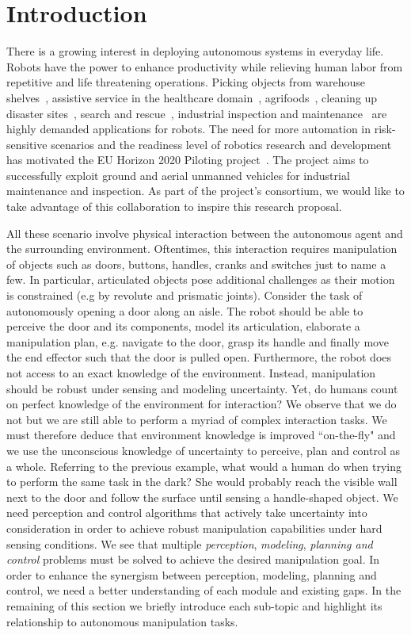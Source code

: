 \section{Introduction}
\label{sec:Introduction}


There is a growing interest in deploying autonomous systems in everyday life. Robots have the power to enhance productivity while relieving human labor from repetitive and life threatening operations. Picking objects from warehouse shelves~\cite{correll2016analysis}, assistive service in the healthcare domain~\cite{cooper2020ari}, agrifoods~\cite{duckett2018agricultural}, cleaning up disaster sites~\cite{nishikawa2019disaster}, search and rescue~\cite{negrello2018walk}, industrial inspection and maintenance~\cite{lattanzi2017review} are highly demanded applications for robots. The need for more automation in risk-sensitive scenarios and the readiness level of robotics research and development has motivated the EU Horizon 2020 Piloting project~\cite{eu-piloting-2020}. The project aims to successfully exploit ground and aerial unmanned vehicles for industrial maintenance and inspection. As part of the project's consortium, we would like to take advantage of this collaboration to inspire this research proposal.     

\medskip
All these scenario involve physical interaction between the autonomous agent and the surrounding environment. Oftentimes, this interaction requires manipulation of objects such as doors, buttons, handles, cranks and switches just to name a few. In particular, articulated objects pose additional challenges as their motion is constrained (e.g by revolute and prismatic joints). Consider the task of autonomously opening a door along an aisle. The robot should be able to perceive the door and its components, model its articulation, elaborate a manipulation plan, e.g. navigate to the door, grasp its handle and finally move the end effector such that the door is pulled open. Furthermore, the robot does not access to an exact knowledge of the environment. Instead, manipulation should be robust under sensing and modeling uncertainty. Yet, do humans count on perfect knowledge of the environment for interaction? We observe that we do not but we are still able to perform a myriad of complex interaction tasks. We must therefore deduce that environment knowledge is improved ``on-the-fly" and we use the unconscious knowledge of uncertainty to perceive, plan and control as a whole. Referring to the previous example, what would a human do when trying to perform the same task in the dark? She would probably reach the visible wall next to the door and follow the surface until sensing a handle-shaped object. We need perception and control algorithms that actively take uncertainty into consideration in order to achieve robust manipulation capabilities under hard sensing conditions.   
We see that multiple \emph{perception}, \emph{modeling}, \emph{planning and control} problems must be solved to achieve the desired manipulation goal. In order to enhance the synergism between perception, modeling, planning and control, we need a better understanding of each module and existing gaps. In the remaining of this section we briefly introduce each sub-topic and highlight its relationship to autonomous manipulation tasks. 


